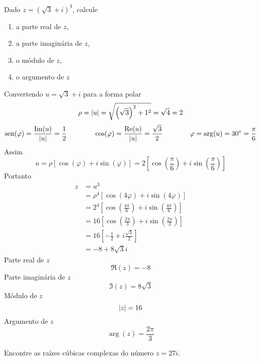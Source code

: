 \documentclass[a4paper,12pt,fleqn]{article}
\begin{document}
Dado \(z=\left(\sqrt{3}+i\right)^4 \), calcule
\begin{enumerate}[label=\alph*),itemsep=0pt]
  \item a parte real de $z$,
  \item a parte imaginária de $z$,
  \item o módulo de $z$,
  \item o argumento de $z$
\end{enumerate}

\begin{answer}
  Convertendo $u=\sqrt{3}+i$ para a forma polar
  \[
    \rho
    = \abs{u}
    = \sqrt{\left(\sqrt{3}\right)^2 + 1^2}
    = \sqrt{4}
    = 2
  \]
  \[
    \sin(\varphi) = \frac{\Im(u)}{\abs{u}} = \frac{1}{2}
    \qquad\qquad
    \cos(\varphi) = \frac{\Re(u)}{\abs{u}} = \frac{\sqrt{3}}{2}
    \qquad\qquad
    \varphi = \arg(u) = \ang{30} = \frac{\pi}{6}
  \]
  Assim
  \[
    u
    = \rho\left[\cos\left(\varphi\right)+ i\sin\left(\varphi\right)\right]
    = 2\left[\cos\left(\frac{\pi}{6}\right)+ i\sin\left(\frac{\pi}{6}\right)\right]
  \]
  Portanto
  \begin{align*}
    z
    & = u^3 \\[2mm]
    & = \rho^4\left[\cos\left(4\varphi\right)+ i\sin\left(4\varphi\right)\right] \\[2mm]
    & = 2^4\left[\cos\left(\frac{4\pi}{6}\right)+ i\sin\left(\frac{4\pi}{6}\right)\right] \\[2mm]
    & = 16\left[\cos\left(\frac{2\pi}{3}\right)+ i\sin\left(\frac{2\pi}{3}\right)\right] \\[2mm]
    & = 16\left[-\frac{1}{2}+ i\frac{\sqrt{3}}{2}\right] \\[2mm]
    & = -8 + 8\sqrt{3}i
  \end{align*}
  Parte real de $z$
  \[
    \Re(z) = -8
  \]
  Parte imaginária de $z$
  \[
    \Im(z) = 8\sqrt{3}
  \]
  Módulo de $z$
  \[
    \abs{z} = 16
  \]
  Argumento de $z$
  \[
    \arg(z) = \frac{2\pi}{3}
  \]
  \clearpage
\end{answer}

Encontre as raízes cúbicas complexas do número \( z = 27i \).
\end{document}
